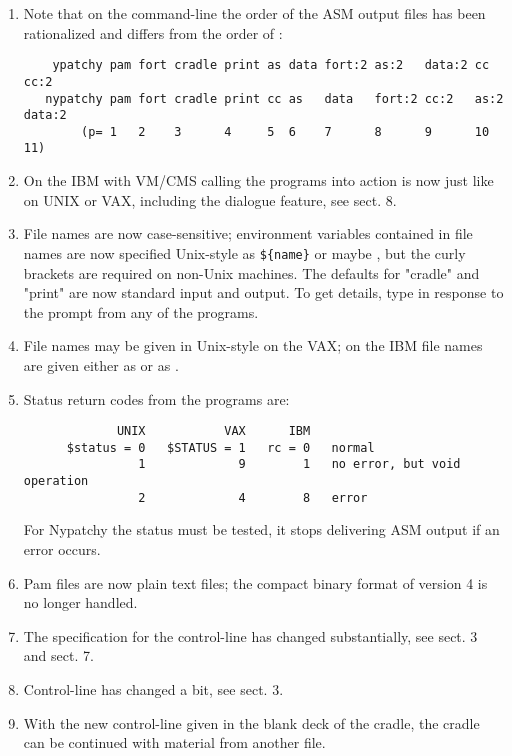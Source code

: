 \begin{enumerate}
\item
Note that on the command-line  the order of the ASM output
files has been rationalized and differs from the order of :
\begin{verbatim}
    ypatchy pam fort cradle print as data fort:2 as:2   data:2 cc   cc:2
   nypatchy pam fort cradle print cc as   data   fort:2 cc:2   as:2 data:2
        (p= 1   2    3      4     5  6    7      8      9      10   11)
\end{verbatim}
\item
On the IBM with VM/CMS calling the programs into action is now
just like on UNIX or VAX, including the dialogue feature, see sect. 8.

\item
File names are now case-sensitive; environment variables contained
in file names are now specified Unix-style as \verb!${name}! or maybe
, but the curly brackets are required on non-Unix machines.
The defaults for "cradle" and "print" are now standard input and output.
To get details, type  in response to the prompt from any of
the programs.

\item
File names may be given in Unix-style on the VAX; on the IBM file
names are given either as  or as
.

\item
Status return codes from the programs are:
\begin{verbatim}
             UNIX           VAX      IBM
      $status = 0   $STATUS = 1   rc = 0   normal
                1             9        1   no error, but void operation
                2             4        8   error
\end{verbatim}
For Nypatchy the status must be tested, it stops delivering ASM output
if an error occurs.

\item
Pam files are now plain text files; the compact binary format of
version 4 is no longer handled.

\item
The specification for the control-line  has changed substantially,
see sect. 3 and sect. 7.

\item
Control-line  has changed a bit, see sect. 3.

\item
With the new control-line  given in the blank deck
of the cradle, the cradle can be continued with material from another file.


\end{enumerate}
